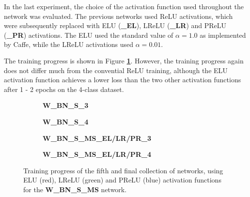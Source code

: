 In the last experiment, the choice of the activation function used throughout the network was evaluated. The previous networks used ReLU activations, which were subsequently replaced with ELU (\textbf{\_EL}), LReLU (\textbf{\_LR}) and PReLU (\textbf{\_PR}) activations. The ELU used the standard value of $\alpha = 1.0$ as implemented by Caffe, while the LReLU activations used $\alpha = 0.01$.

The training progress is shown in Figure \textbf{\ref{fig:weighted_batchnorm_shuffle_msra_acts_training}}. However, the training progress again does not differ much from the convential ReLU training, although the ELU activation function achieves a lower loss than the two other activation functions after 1 - 2 epochs on the 4-class dataset.\\


\begin {figure}[!htb]
	\begin {subfigure}[b]{0.4\linewidth}
		\scalebox{0.65}{}
		\caption{\textbf{W\_BN\_S\_3}}
	\end {subfigure}\hspace{1.75cm}
	\begin {subfigure}[b]{0.4\linewidth}
		\scalebox{0.65}{}
		\caption{\textbf{W\_BN\_S\_4}}
	\end {subfigure}

	\begin {subfigure}[b]{0.4\linewidth}
		\scalebox{0.65}{}
		\caption{\textbf{W\_BN\_S\_MS\_EL/LR/PR\_3}}
	\end {subfigure}\hspace{1.75cm}
	\begin {subfigure}[b]{0.4\linewidth}
		\scalebox{0.65}{}
		\caption{\textbf{W\_BN\_S\_MS\_EL/LR/PR\_4}}
	\end {subfigure}

		\caption[Training progress of the fifth collection of networks.]{Training progress of the fifth and final collection of networks, using ELU (red), LReLU (green) and PReLU (blue) activation functions for the \textbf{W\_BN\_S\_MS} network.}
		\label{fig:weighted_batchnorm_shuffle_msra_acts_training}
\end {figure}


